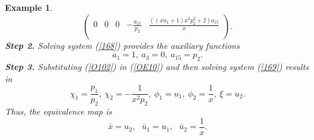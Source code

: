 \documentclass[12pt]{article}
\newtheorem{example}[theorem]{Example}
\begin{document}
\begin{example}
\begin{equation}
\begin{pmatrix}
0&0&0&-\frac{a_{15}}{p_2}&\frac{((xu_1+1)x^2p_2^2+2)a_{15}}{x}\\
\end{pmatrix}.
\end{equation}
\textbf{Step 2.} Solving system (\ref{168}) provides the auxiliary functions  
\begin{equation}\label{O102}
a_1=1,~ a_3=0,~a_{15}=p_2.
\end{equation}
\textbf{Step 3.} Substituting (\ref{O102}) in  (\ref{OE10}) and then solving system (\ref{169}) results in  
$$\chi_1=\frac{p_1}{p_2}, ~\chi_2=-\frac{1}{x^2p_2}, ~ \phi_1=u_1, ~\phi_2=\frac{1}{x},~\xi=u_2.$$
 Thus, the equivalence map is
\begin{equation}\label{O87}
\bar{x}=u_2, ~~~\bar{u}_1=u_1,~~~\bar{u}_2=\frac{1}{x}.
\end{equation}
\end{example}


\vspace{0.5cm}
\end{document}
